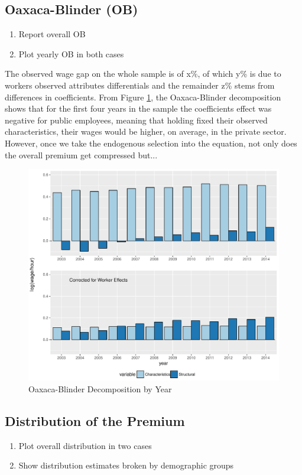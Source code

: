\documentclass{article}
\begin{document}
\subsection{Oaxaca-Blinder (OB)}
\begin{enumerate}
    \item Report overall OB 
    \item Plot yearly OB in both cases
\end{enumerate}
The observed wage gap on the whole sample is of x\%, of which y\% is due to workers observed attributes differentials and the remainder z\% stems from differences in coefficients. From Figure \ref{fig:yearly}, the Oaxaca-Blinder decomposition shows that for the first four years in the sample the coefficients effect was negative for public employees, meaning that holding fixed their observed characteristics, their wages would be higher, on average, in the private sector. \\

\noindent
However, once we take the endogenous selection into the equation, not only does the overall premium get compressed but...


\begin{figure}[h!]
    \includegraphics[scale=0.65]{graphs/002_yearly_ob_onepc.pdf}
    \caption{Oaxaca-Blinder Decomposition by Year}
    \label{fig:yearly}
\end{figure}
\subsection{Distribution of the Premium}
\begin{enumerate}
    \item Plot overall distribution in two cases
    \item Show distribution estimates broken by demographic groups
\end{enumerate}
\end{document}
